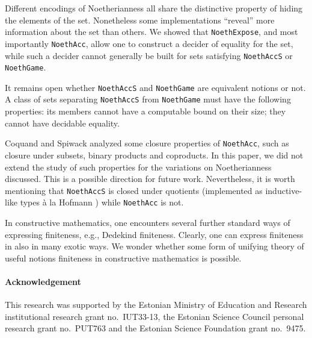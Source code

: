 \documentclass{eptcs}
\begin{document}
Different encodings of Noetherianness all share the distinctive property of
hiding the elements of the set. Nonetheless some implementations ``reveal'' more
information about the set than others. We showed that \verb;NoethExpose;, and
most importantly \verb;NoethAcc;, allow one to construct a decider of equality for
the set, while such a decider cannot generally be built for sets satisfying
\verb;NoethAccS; or \verb;NoethGame;.

It remains open whether \verb;NoethAccS; and \verb;NoethGame; are equivalent notions
or not. A class of sets separating \verb;NoethAccS; from \verb;NoethGame; must
have the following properties: its members cannot have a computable bound on their size; they cannot have decidable equality.

Coquand and Spiwack \cite{Coquand} analyzed some closure properties of
\verb;NoethAcc;, such as closure under subsets, binary products and
coproducts. In this paper, we did not extend the study of such
properties for the variations on Noetherianness discussed.  This is a
possible direction for future work. Nevertheless, it is worth
mentioning that \verb;NoethAccS; is closed under quotients
(implemented as inductive-like types \`a la Hofmann \cite{Hofmann}) while
\verb;NoethAcc; is not.

In constructive mathematics, one encounters several further standard
ways of expressing finiteness, e.g., Dedekind finiteness. Clearly, one
can express finiteness in also in many exotic ways. We wonder whether
some form of unifying theory of useful notions finiteness in
constructive mathematics is possible.

\paragraph{Acknowledgement}
This research was supported by the Estonian Ministry of Education and Research
institutional research grant no.~IUT33-13, the Estonian Science Council personal research grant \linebreak no.~PUT763 and the Estonian Science Foundation
grant no.~9475.

\newcommand{\doi}[1]{\href{http://dx.doi.org/#1}{doi: #1}}
\end{document}
